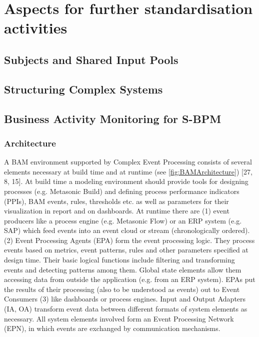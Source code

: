 \chapter{Aspects for further standardisation activities}



\section{Subjects and Shared Input Pools}


\section{Structuring Complex Systems}

\section{Business Activity Monitoring for S-BPM}

\subsection{Architecture }  
A BAM environment supported by Complex Event Processing consists of several elements necessary at build time and at runtime (see \ref{fig:BAMArchitecture}) [27, 8, 15]. At build time a modeling environment should provide tools for designing processes (e.g. Metasonic Build) and defining process performance indicators (PPIs), BAM events, rules, thresholds etc. as well as parameters for their visualization in report and on dashboards. At runtime there are (1) event producers like a process engine (e.g. Metasonic Flow) or an ERP system (e.g. SAP) which feed events into an event cloud or stream (chronologically ordered). (2) Event Processing Agents (EPA) form the event processing logic. They process events based on metrics, event patterns, rules and other parameters specified at design time. Their basic logical functions include filtering and transforming events and detecting patterns among them. Global state elements allow them accessing data from outside the application (e.g. from an ERP system). EPAs put the results of their processing (also to be understood as events) out to Event Consumers (3) like dashboards or process engines. Input and Output Adapters (IA, OA) transform event data between different formats of system elements as necessary. All system elements involved form an Event Processing Network (EPN), in which events are exchanged by communication mechanisms.

